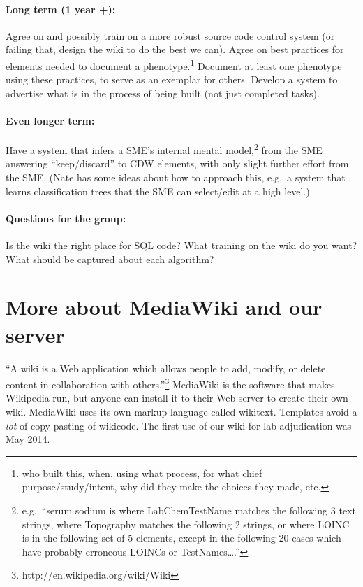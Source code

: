 \documentclass{tufte-handout}
\begin{document}
\paragraph{Long term (1 year +):} Agree on and possibly train on a more
robust source code control system (or failing that, design the wiki to do
the best we can). Agree on best practices for elements needed to document
a phenotype.\footnote{who built this, when, using what process, for
  what chief purpose/study/intent, why did they make the choices they
  made, etc.} Document at least one phenotype using these practices,
to serve as an exemplar for others. Develop a system to advertise what is in the
process of being built (not just completed tasks).

\paragraph{Even longer term:} Have a system that infers a SME's internal mental
model,\footnote{e.g.\ ``serum sodium is where LabChemTestName matches
  the following 3 text strings, where Topography matches the following
  2 strings, or where LOINC is in the following set of 5 elements,
  except in the following 20 cases which have probably erroneous
  LOINCs or TestNames\ldots{}.''} from the SME answering
``keep/discard'' to CDW elements, with only slight further effort from
the SME. (Nate has some ideas about how to approach this, e.g.\ a system that learns
classification trees that the SME can select/edit at a high level.)

\paragraph{Questions for the group:} Is the wiki the right place for
SQL code? What training on the wiki do you want? What should be
captured about each algorithm?

\section{More about MediaWiki and our server}

``A wiki is a Web application which allows people to add, modify, or
delete content in collaboration with
others.''\footnote{http://en.wikipedia.org/wiki/Wiki} MediaWiki is the
software that makes Wikipedia run, but anyone can install it to their
Web server to create their own wiki. MediaWiki uses its own markup
language called wikitext. Templates avoid a \emph{lot} of copy-pasting
of wikicode. The first use of our wiki for lab adjudication was May 2014.
\end{document}
